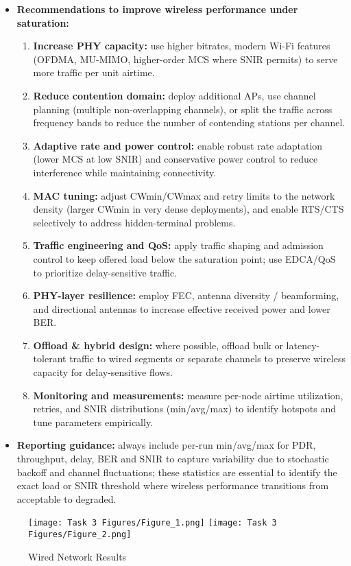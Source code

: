 \documentclass{rapport}
\begin{document}
\begin{itemize}
  \item \textbf{Recommendations to improve wireless performance under saturation:}
    \begin{enumerate}
      \item \textbf{Increase PHY capacity:} use higher bitrates, modern Wi-Fi features (OFDMA, MU-MIMO, higher-order MCS where SNIR permits) to serve more traffic per unit airtime.
      \item \textbf{Reduce contention domain:} deploy additional APs, use channel planning (multiple non-overlapping channels), or split the traffic across frequency bands to reduce the number of contending stations per channel.
      \item \textbf{Adaptive rate and power control:} enable robust rate adaptation (lower MCS at low SNIR) and conservative power control to reduce interference while maintaining connectivity.
      \item \textbf{MAC tuning:} adjust CWmin/CWmax and retry limits to the network density (larger CWmin in very dense deployments), and enable RTS/CTS selectively to address hidden-terminal problems.
      \item \textbf{Traffic engineering and QoS:} apply traffic shaping and admission control to keep offered load below the saturation point; use EDCA/QoS to prioritize delay-sensitive traffic.
      \item \textbf{PHY-layer resilience:} employ FEC, antenna diversity / beamforming, and directional antennas to increase effective received power and lower BER.
      \item \textbf{Offload & hybrid design:} where possible, offload bulk or latency-tolerant traffic to wired segments or separate channels to preserve wireless capacity for delay-sensitive flows.
      \item \textbf{Monitoring and measurements:} measure per-node airtime utilization, retries, and SNIR distributions (min/avg/max) to identify hotspots and tune parameters empirically.
    \end{enumerate}
  \item \textbf{Reporting guidance:} always include per-run min/avg/max for PDR, throughput, delay, BER and SNIR to capture variability due to stochastic backoff and channel fluctuations; these statistics are essential to identify the exact load or SNIR threshold where wireless performance transitions from acceptable to degraded.
\end{itemize}


\begin{figure}[H]
  \centering
  \texttt{[image: Task 3 Figures/Figure\_1.png]}
  \texttt{[image: Task 3 Figures/Figure\_2.png]}
  \caption{Wired Network Results}
  \label{fig:wired_perf}
\end{figure}
\end{document}
